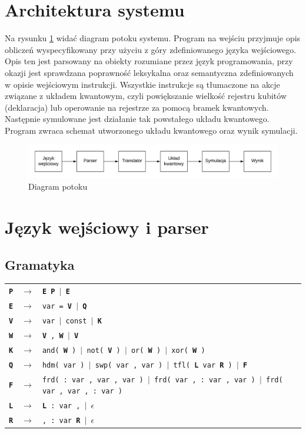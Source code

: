 \section{Architektura systemu}
Na rysunku \ref{fig:potok} widać diagram potoku systemu. Program na wejściu przyjmuje opis obliczeń wyspecyfikowany przy użyciu z góry zdefiniowanego języka wejściowego. Opis ten jest parsowany na obiekty rozumiane przez język programowania, przy okazji jest sprawdzana poprawność leksykalna oraz semantyczna zdefiniowanych w opisie wejściowym instrukcji. Wszystkie instrukcje są tłumaczone na akcje związane z układem kwantowym, czyli powiększanie wielkość rejestru kubitów (deklaracja) lub operowanie na rejestrze za pomocą bramek kwantowych. Następnie symulowane jest działanie tak powstałego układu kwantowego. Program zwraca schemat utworzonego układu kwantowego oraz wynik symulacji.
\begin{figure}[H]
    \includegraphics[width=\linewidth]{systemDiag.png}
    \caption{Diagram potoku}
    \label{fig:potok}
\end{figure}
\section{Język wejściowy i parser}
\subsection{Gramatyka}
\begin{tabular}{ l c l } 
    \texttt{\textbf{P}} & $\rightarrow$ & \texttt{\textbf{E} \textbf{P} $|$ \textbf{E}} \\ 
    \texttt{\textbf{E}} & $\rightarrow$ & \texttt{var = \textbf{V} $|$ \textbf{Q}} \\ 
    \texttt{\textbf{V}} & $\rightarrow$ & \texttt{var $|$ const $|$ \textbf{K}} \\ 
    \texttt{\textbf{W}} & $\rightarrow$ & \texttt{\textbf{V} , \textbf{W} $|$ \textbf{V}} \\
    \texttt{\textbf{K}} & $\rightarrow$ & \texttt{and( \textbf{W} ) $|$ not( \textbf{V} ) $|$ or( \textbf{W} ) $|$ xor( \textbf{W} )}\\
    \texttt{\textbf{Q}} & $\rightarrow$ & \texttt{hdm( var ) $|$ swp( var , var ) $|$ tfl( \textbf{L} var \textbf{R} ) $|$ \textbf{F}}\\
    \texttt{\textbf{F}} & $\rightarrow$ & \texttt{frd( : var , var , var ) $|$ frd( var , : var , var ) $|$ frd( var , var , : var )}\\
    \texttt{\textbf{L}} & $\rightarrow$ & \texttt{\textbf{L} : var , $|$ $\epsilon$}\\
    \texttt{\textbf{R}} & $\rightarrow$ & \texttt{, : var \textbf{R} $|$ $\epsilon$}\\
\end{tabular}
